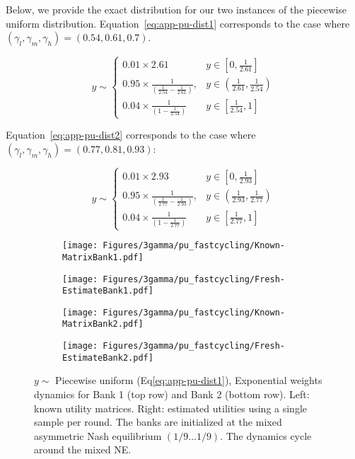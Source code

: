 Below, we provide the exact distribution for our two instances of the piecewise uniform distribution. Equation~\ref{eq:app-pu-dist1} corresponds to the case where $(\gamma_l,\gamma_m,\gamma_h) = (0.54,0.61,0.7)$.

\begin{equation}
\label{eq:app-pu-dist1}
y \sim  
\begin{cases}  
0.01 \times 2.61 & y \in [0, \frac{1}{2.61}] \\  
0.95 \times \frac{1}{(\frac{1}{2.54}- \frac{1}{2.61})}, & y \in (\frac{1}{2.61}, \frac{1}{2.54}) \\  
0.04 \times \frac{1}{(1 - \frac{1}{2.54})} & y \in [\frac{1}{2.54}, 1]
\end{cases}
\end{equation}

Equation~\ref{eq:app-pu-dist2} corresponds to the case where $(\gamma_l,\gamma_m,\gamma_h) = (0.77,0.81,0.93)$:

\begin{equation}
\label{eq:app-pu-dist2}
y \sim  
\begin{cases}  
0.01 \times 2.93 & y \in [0, \frac{1}{2.93}] \\  
0.95 \times \frac{1}{(\frac{1}{2.77}- \frac{1}{2.93})}, & y \in (\frac{1}{2.93}, \frac{1}{2.77}) \\  
0.04 \times \frac{1}{(1 - \frac{1}{2.77})} & y \in [\frac{1}{2.77}, 1]
\end{cases}
\end{equation}



\begin{figure}[H]
    \centering
    \begin{subfigure}{0.49\linewidth}
        \centering
        \texttt{[image: Figures/3gamma/pu\_fastcycling/Known-MatrixBank1.pdf]}
    \end{subfigure}
    \begin{subfigure}{0.49\linewidth}
        \centering
        \texttt{[image: Figures/3gamma/pu\_fastcycling/Fresh-EstimateBank1.pdf]}
    \end{subfigure}

    \begin{subfigure}{0.49\linewidth}
        \centering
        \texttt{[image: Figures/3gamma/pu\_fastcycling/Known-MatrixBank2.pdf]}
    \end{subfigure}
    \begin{subfigure}{0.49\linewidth}
        \centering
        \texttt{[image: Figures/3gamma/pu\_fastcycling/Fresh-EstimateBank2.pdf]}
    \end{subfigure}
\caption{$y \sim$ Piecewise uniform (Eq\eqref{eq:app-pu-dist1}), Exponential weights dynamics for Bank 1 (top row) and Bank 2 (bottom row). Left: known utility matrices. Right: estimated utilities using a single sample per round. The banks are initialized at the mixed asymmetric Nash equilibrium $(1/9 \ldots 1/9)$. The dynamics cycle around the mixed NE. \label{fig:dyna-puf-fastcycles}}
\end{figure}


